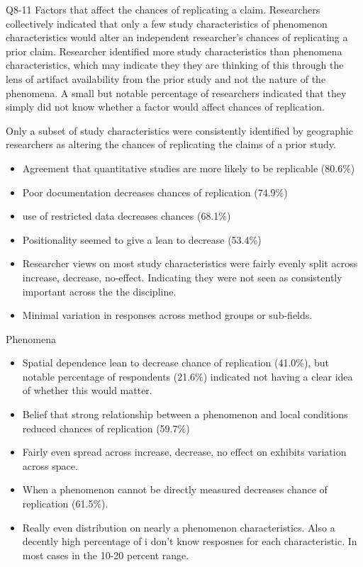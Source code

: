 \documentclass[]{interact}
\theoremstyle{plain}%
\theoremstyle{definition}
\theoremstyle{remark}
\begin{document}
Q8-11 Factors that affect the chances of replicating a claim.
Researchers collectively indicated that only a few study characteristics of phenomenon characteristics would alter an independent researcher's chances of replicating a prior claim. 
Researcher identified more study characteristics than phenomena characteristics, which may indicate they they are thinking of this through the lens of artifact availability from the prior study and not the nature of the phenomena. 
A small but notable percentage of researchers indicated that they simply did not know whether a factor would affect chances of replication. 

Only a subset of study characteristics were consistently identified by geographic researchers as altering the chances of replicating the claims of a prior study.
\begin{itemize}
    \item Agreement that quantitative studies are more likely to be replicable (80.6\%)
    \item Poor documentation decreases chances of replication (74.9\%)
    \item use of restricted data decreases chances (68.1\%)
    \item Positionality seemed to give a lean to decrease (53.4\%)
    \item Researcher views on most study characteristics were fairly evenly split across increase, decrease, no-effect. Indicating they were not seen as consistently important across the the discipline. 
    \item Minimal variation in responses across method groups or sub-fields. 
\end{itemize}

Phenomena
\begin{itemize}
    \item Spatial dependence lean to decrease chance of replication (41.0\%), but notable percentage of respondents (21.6\%) indicated not having a clear idea of whether this would matter.
    \item Belief that strong relationship between a phenomenon and local conditions reduced chances of replication (59.7\%)
    \item Fairly even spread across increase, decrease, no effect on exhibits variation across space.
    \item When a phenomenon cannot be directly measured decreases chance of replication (61.5\%).
    \item Really even distribution on nearly a phenomenon characteristics. Also a decently high percentage of i don't know resposnes for each characteristic. In most cases in the 10-20 percent range. 
\end{itemize}
\end{document}
